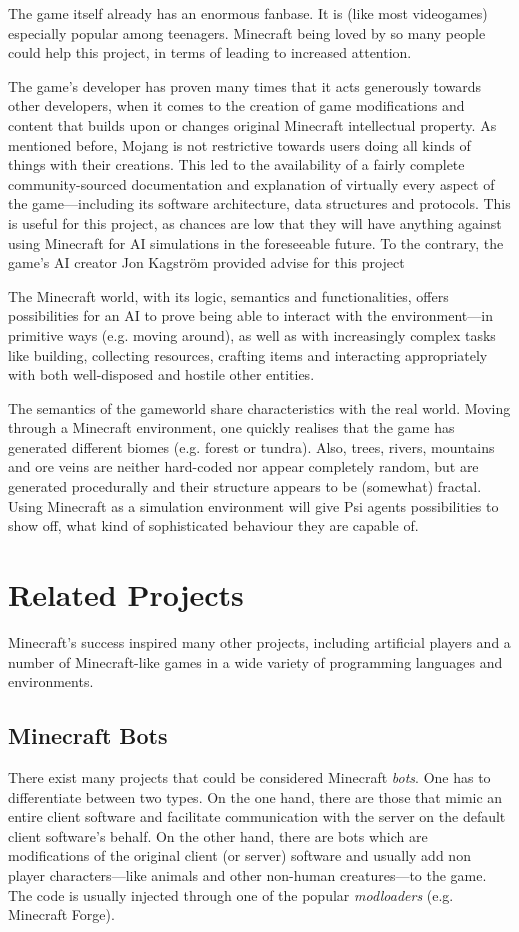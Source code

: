 The game itself already has an enormous fanbase. It is (like most videogames) especially popular among teenagers. Minecraft being loved by so many people could help this project, in terms of leading to increased attention.

The game's developer has proven many times that it acts generously towards  other developers, when it comes to the creation of game modifications and content that builds upon or changes original Minecraft intellectual property. As mentioned before, Mojang is not restrictive towards users doing all kinds of things with their creations. This led to the availability of a fairly complete community-sourced  documentation and explanation of virtually every aspect of the game---including its software architecture, data structures and protocols. This is useful for this project, as chances are low that they will have anything against using Minecraft for AI simulations in the foreseeable future. To the contrary, the game's AI creator Jon Kagström provided advise for this project

The Minecraft world, with its logic, semantics and functionalities, offers possibilities for an AI to prove being able to interact with the environment---in primitive ways (e.g. moving around), as well as with increasingly complex tasks like building, collecting resources, crafting items and interacting appropriately with both well-disposed and hostile other entities.

The semantics of the gameworld share characteristics with the real world. Moving through a Minecraft environment, one quickly realises that the game has generated different biomes (e.g. forest or tundra). Also, trees, rivers, mountains and ore veins are neither hard-coded nor appear completely random, but are generated procedurally and their structure appears to be (somewhat) fractal. Using Minecraft as a simulation environment will give Psi agents possibilities to show off, what kind of sophisticated behaviour they are capable of.

    \section{Related Projects}
    \label{sec:3:relatedprojects}
Minecraft's success inspired many other projects, including artificial players and a number of Minecraft-like games in a wide variety of programming languages and environments.


        \subsection{Minecraft Bots}
There exist many projects that could be considered Minecraft \emph{bots}. One has to differentiate between two types. On the one hand, there are those that mimic an entire client software and facilitate communication with the server on the default client software's behalf. On the other hand, there are bots which are modifications of the original client (or server) software and usually add non player characters---like animals and other non-human creatures---to the game. The code is usually injected through one of the popular \emph{modloaders} (e.g. Minecraft Forge).

